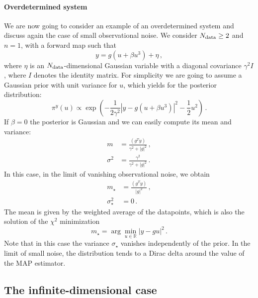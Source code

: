\paragraph{Overdetermined system}
We are now going to consider an example of an overdetermined system and discuss
again the case of small observational noise. We consider $N_{\rm data}\geq 2$ and
$n=1$, with a forward map such that
\begin{equation}
 \label{eq:OverDetForwMap}
 y = g(u + \beta u^3) + \eta\, ,
\end{equation} 
where $\eta$ is an $N_{\rm data}$-dimensional Gaussian variable with a diagonal
covariance $\gamma^2 I$, where $I$ denotes the identity matrix. For simplicity
we are going to assume a Gaussian prior with unit variance for $u$, which yields
for the posterior distribution:
\begin{equation}
  \label{eq:OverDetPost}
  \pi^y(u) \propto 
    \exp\left(
      -\frac{1}{2\gamma^2} \left| y - g(u + \beta u^3)\right|^2
      -\frac12 u^2
    \right)\, .
\end{equation} 
If $\beta=0$ the posterior is Gaussian and we can easily compute its mean and variance: 
\begin{align}
  m &= \frac{(g^T y)}{\gamma^2 + |g|^2} \, , \\
  \sigma^2 &=
    \frac{\gamma^2}{\gamma^2 + |g|^2}\, .
\end{align}
In this case, in the limit of vanishing observational noise, we obtain
\begin{align}
  m_\star &= \frac{(g^T y)}{|g|^2} \, ,\\
  \sigma_\star^2 &= 0\, .
\end{align}
The mean is given by the weighted average of the datapoints, which is also the solution of the $\chi^2$ minimization
\begin{equation}
  m_\star = \arg\min_{u\in\mathbb{R}} \left|y - g u\right|^2\, .
\end{equation}
Note that in this case the variance $\sigma_\star$ vanishes independently of the prior. In the limit of small noise, the distribution tends to a Dirac delta around the value of the MAP estimator.  


\subsection{The infinite-dimensional case}
\label{sec:infin-dimens-case}


